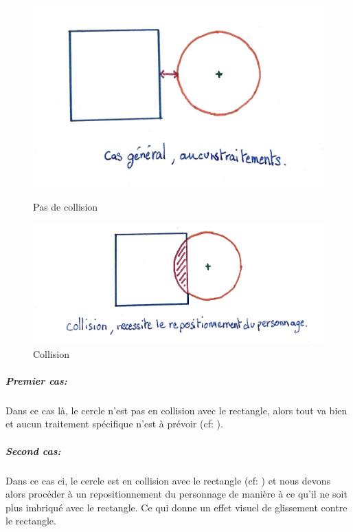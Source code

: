 \documentclass[11pt]{article}
\begin{document}
\begin{figure}
	\begin{minipage}{0.48\textwidth}
		\includegraphics[width=\linewidth]{image/fig2.jpg}
		\caption{Pas de collision}
		\label{fig:pas_de_collision}
	\end{minipage}
	\begin{minipage}{0.48\textwidth}
		\includegraphics[width=\linewidth]{image/fig3.jpg}
		\caption{Collision}
		\label{fig:collision}
	\end{minipage}
\end{figure}

\subparagraph{Premier cas:} 


Dans ce cas là, le cercle n'est pas en collision avec le rectangle, alors 
tout va bien et aucun traitement spécifique n'est à prévoir (cf: ). 

\subparagraph{Second cas:} 



Dans ce cas ci, le cercle est en collision avec le rectangle (cf: ) et nous 
devons alors procéder à un repositionnement du personnage de manière à ce 
qu'il ne soit plus imbriqué avec le rectangle. Ce qui donne un effet visuel 
de glissement contre le rectangle.
\end{document}
